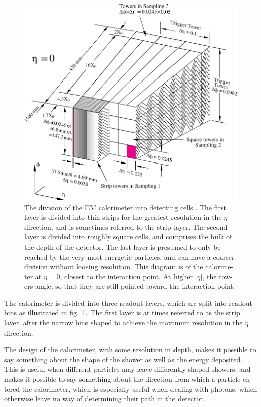 \begin{english}
\begin{figure}[hbtp]
\begin{minipage}[b]{.69\textwidth}
\includegraphics[width=\textwidth]{caldiv}
\end{minipage}
\begin{minipage}[b]{.3\textwidth}
\caption{The division of the EM calorimeter into detecting cells \cite{egede}. The first layer is divided into thin strips for the greatest resolution in the $\eta$ direction, and is sometimes referred to the strip layer. The second layer is divided into roughly square cells, and comprises the bulk of the depth of the detector. The last layer is presumed to only be reached by the very most energetic particles, and can have a coarser division without loosing resolution. This diagram is of the calorimeter at $\eta = 0$, closest to the interaction point. At higher $|\eta|$, the towers angle, so that they are still pointed toward the interaction point.}
\label{caldiv}
\end{minipage}
\end{figure}

The calorimeter is divided into three readout layers, which are split into readout bins as illustrated in fig.~\ref{caldiv}. The first layer is at times referred to as the strip layer, after the narrow bins shaped to achieve the maximum resolution in the $\eta$ direction.

The design of the calorimeter, with some resolution in depth, makes it possible to say something about the shape of the shower as well as the energy deposited. This is useful when different particles may leave differently shaped showers, and makes it possible to say something about the direction from which a particle entered the calorimeter, which is especially useful when dealing with photons, which otherwise leave no way of determining their path in the detector.


\end{english}
